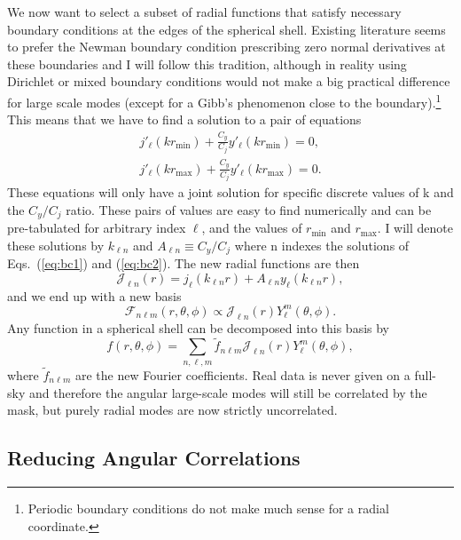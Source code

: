 \documentclass[fleqn,usenatbib]{mnras}
\newcommand{\rmin}{r_\mathrm{min}}
\newcommand{\rmax}{r_\mathrm{max}}
\begin{document}
We now want to select a subset of radial functions that satisfy necessary
boundary conditions at the edges of the spherical shell. Existing literature
seems to prefer the Newman boundary condition prescribing zero normal derivatives at
these boundaries and I will follow this tradition, although in reality using
Dirichlet or mixed boundary conditions would not make a big practical
difference for large scale modes (except for a Gibb's phenomenon close to the
boundary).\footnote{Periodic boundary conditions do not make much sense for a
radial coordinate.} This means that we have to find a solution to a pair of
equations
\begin{align}
\label{eq:bc1}
j'_\ell(k\rmin) + \frac{C_y}{C_j}y'_\ell(k\rmin) = 0,\\
\label{eq:bc2}
j'_\ell(k\rmax) + \frac{C_y}{C_j}y'_\ell(k\rmax) = 0. 
\end{align} 
\noindent 
These equations will only have a joint solution for specific discrete values of
k and the $C_y/C_j$ ratio. These pairs of values are easy to find numerically
and can be pre-tabulated for arbitrary index $\ell$, and the values of $\rmin$
and $\rmax$. I will denote these solutions by $k_{\ell n}$ and $A_{\ell n}
\equiv C_y/C_j$ where n indexes the solutions of Eqs.~(\ref{eq:bc1}) and
(\ref{eq:bc2}). The new radial functions are then
\begin{equation} 
\label{eq:newbasis}
\mathcal{J}_{\ell n}(r) = j_\ell(k_{\ell n}r) + A_{\ell n}y_\ell(k_{\ell n}r),
\end{equation}
\noindent
and we end up with a new basis
\begin{equation}
\mathcal{F}_{n \ell m}(r,\theta,\phi) \propto \mathcal{J}_{\ell n}(r)Y^m_\ell(\theta,\phi).
\end{equation}
Any function in a spherical shell can be decomposed into this basis by
\begin{equation}
f(r,\theta,\phi) = \displaystyle\sum_{n,\ell,m}\widetilde{f}_{n \ell m}\mathcal{J}_
{\ell n}(r)Y^m_\ell(\theta,\phi),
\end{equation}
\noindent
where $\widetilde{f}_{n \ell m}$ are the new Fourier coefficients. Real data is
never given on a full-sky and therefore the angular large-scale modes will
still be correlated by the mask, but purely radial modes are now strictly
uncorrelated.

\subsection{Reducing Angular Correlations}
\end{document}
